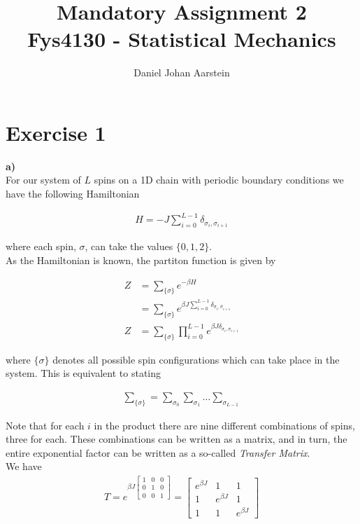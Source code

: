 \documentclass[12pt]{article}
\title{Mandatory Assignment 2\\Fys4130 - Statistical Mechanics}
\author{Daniel Johan Aarstein}
\begin{document}
\maketitle
\section*{Exercise 1}
\textbf{a)} \\
For our system of $L$ spins on a 1D chain with periodic boundary conditions we
have the following Hamiltonian

\begin{align*}
    H = -J\sum_{i=0}^{L-1}\delta_{\sigma_i, \sigma_{i+1}}
\end{align*}

where each spin, $\sigma$, can take the values $\{0, 1, 2\}$. \\
As the Hamiltonian is known, the partiton function is given by

\begin{align*}
    Z &= \sum_{\{\sigma\}}e^{-\beta H} \\
    &= \sum_{\{\sigma\}}e^{\beta J \sum_{i=0}^{L-1}\delta_{\sigma_i,
    \sigma_{i+1}}} \\
    Z &= \sum_{\{\sigma\}}\prod_{i=0}^{L-1}e^{\beta J \delta_{\sigma_i,
    \sigma_{i+1}}}
\end{align*}

where $\{\sigma\}$ denotes all possible spin configurations which can take
place in the system. This is equivalent to stating

\begin{align*}
    \sum_{\{\sigma\}} = \sum_{\sigma_0}\sum_{\sigma_1}\dots\sum_{\sigma_{L-1}}
\end{align*}

Note that for each $i$ in the product there are nine different combinations of
spins, three for each. These combinations can be written as a matrix, and in
turn, the entire exponential factor can be written as a so-called \textit{Transfer
Matrix}. \\
We have
\begin{align*}
    T = e^{\beta J\begin{bmatrix}1&0&0\\0&1&0\\0&0&1\end{bmatrix}}
    = \begin{bmatrix}e^{\beta J}&1&1 \\ 1&e^{\beta J}&1 \\ 1&1&e^{\beta J} \end{bmatrix}
\end{align*}
\end{document}
